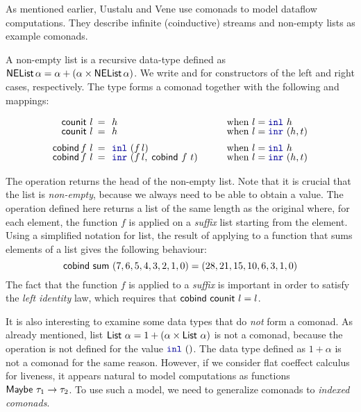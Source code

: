 As mentioned earlier, Uustalu and Vene \cite{comonads-notions} use comonads to model dataflow
computations. They describe infinite (coinductive) streams and non-empty lists as example comonads.

\begin{example}
A non-empty list is a recursive data-type defined as $\ident{NEList}\,\alpha = \alpha + (\alpha \times \ident{NEList}\,\alpha)$.
We write  and  for constructors of the left and right cases, respectively. The
type  forms a comonad together with the following  and  mappings:

\begin{equation*}
\begin{array}{rclll}
\ident{counit}~l &\narrow{=}& h &\quad&\textnormal{when}~l=\kvd{inl}~h\\[-0.25em]
\ident{counit}~l &\narrow{=}& h &&\textnormal{when}~l=\kvd{inr}~(h, t)\\[0.5em]
\ident{cobind}\,f~l &\narrow{=}& \kvd{inl}~(f\,l) &&\textnormal{when}~l=\kvd{inl}~h\\[-0.25em]
\ident{cobind}\,f~l &\narrow{=}& \kvd{inr}~(f\,l,\;\ident{cobind}~f~t) &&\textnormal{when}~l=\kvd{inr}~(h, t)
\end{array}
\end{equation*}
\end{example}

\noindent
The  operation returns the head of the non-empty list. Note that it is crucial that
the list is \emph{non-empty}, because we always need to be able to obtain a value. The 
operation defined here returns a list of the same length as the original where, for each element, the
function $f$ is applied on a \emph{suffix} list starting from the element. Using a simplified
notation for list, the result of applying  to a function that sums elements of a
list gives the following behaviour:
%
\begin{equation*}
\textnormal{\sffamily cobind}~\textnormal{\sffamily sum}~(7,6,5,4,3,2,1,0) = (28,21,15,10,6,3,1,0)
\end{equation*}
%
The fact that the function $f$ is applied to a \emph{suffix} is important in order to satisfy the
\emph{left identity} law, which requires that $\textnormal{\sffamily cobind}~\textnormal{\sffamily counit}~l = l$.

It is also interesting to examine some data types that do \emph{not} form a comonad. As already
mentioned, list $\ident{List}~\alpha = 1 + (\alpha \times \ident{List}~\alpha)$ is not a comonad,
because the  operation is not defined for the value $\kvd{inl}~()$. The 
data type defined as $1 + \alpha$ is not a comonad for the same reason. However, if we consider
flat coeffect calculus for liveness, it appears natural to model computations as functions
$\textnormal{\sffamily Maybe}~\tau_1 \rightarrow \tau_2$. To use such a model, we need to generalize comonads
to \emph{indexed comonads}.

